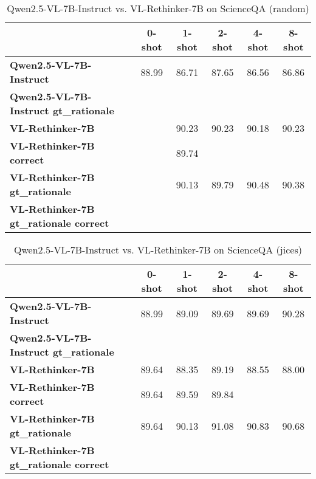 \begin{table}
\caption{Qwen2.5-VL-7B-Instruct vs. VL-Rethinker-7B on ScienceQA (random)}
\label{tab:Qwen2.5-VL-7B-Instruct_ScienceQA_TRAIN_random}
\begin{tabular}{lccccc}
\toprule
 & 0-shot & 1-shot & 2-shot & 4-shot & 8-shot \\
\midrule
\textbf{Qwen2.5-VL-7B-Instruct} & 88.99 & 86.71 & 87.65 & 86.56 & 86.86 \\
\textbf{Qwen2.5-VL-7B-Instruct gt\_rationale} &  &  &  &  &  \\
\textbf{VL-Rethinker-7B} &  & 90.23 & 90.23 & 90.18 & 90.23 \\
\textbf{VL-Rethinker-7B correct} &  & 89.74 &  &  &  \\
\textbf{VL-Rethinker-7B gt\_rationale} &  & 90.13 & 89.79 & 90.48 & 90.38 \\
\textbf{VL-Rethinker-7B gt\_rationale correct} &  &  &  &  &  \\
\bottomrule
\end{tabular}
\end{table}


\begin{table}
\caption{Qwen2.5-VL-7B-Instruct vs. VL-Rethinker-7B on ScienceQA (jices)}
\label{tab:Qwen2.5-VL-7B-Instruct_ScienceQA_TRAIN_jices}
\begin{tabular}{lccccc}
\toprule
 & 0-shot & 1-shot & 2-shot & 4-shot & 8-shot \\
\midrule
\textbf{Qwen2.5-VL-7B-Instruct} & 88.99 & 89.09 & 89.69 & 89.69 & 90.28 \\
\textbf{Qwen2.5-VL-7B-Instruct gt\_rationale} &  &  &  &  &  \\
\textbf{VL-Rethinker-7B} & 89.64 & 88.35 & 89.19 & 88.55 & 88.00 \\
\textbf{VL-Rethinker-7B correct} & 89.64 & 89.59 & 89.84 &  &  \\
\textbf{VL-Rethinker-7B gt\_rationale} & 89.64 & 90.13 & 91.08 & 90.83 & 90.68 \\
\textbf{VL-Rethinker-7B gt\_rationale correct} &  &  &  &  &  \\
\bottomrule
\end{tabular}
\end{table}


